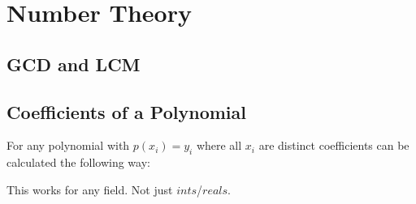 \section{Number Theory}
\subsection{GCD and LCM}


\subsection{Coefficients of a Polynomial}
For any polynomial with $p(x_i) = y_i$ where all $x_i$ are distinct
coefficients can be calculated the following way:

This works for any field. Not just $ints$/$reals$.